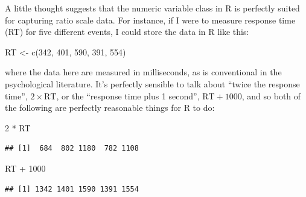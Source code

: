 \documentclass[
]{book}
\newenvironment{Shaded}{\begin{snugshade}}{\end{snugshade}}
\newcommand{\DecValTok}[1]{\textcolor[rgb]{0.00,0.00,0.81}{#1}}
\newcommand{\FunctionTok}[1]{\textcolor[rgb]{0.00,0.00,0.00}{#1}}
\newcommand{\NormalTok}[1]{#1}
\newcommand{\OtherTok}[1]{\textcolor[rgb]{0.56,0.35,0.01}{#1}}
\newcommand{\SpecialCharTok}[1]{\textcolor[rgb]{0.00,0.00,0.00}{#1}}
\begin{document}
A little thought suggests that the numeric variable class in R is perfectly suited for capturing ratio scale data. For instance, if I were to measure response time (RT) for five different events, I could store the data in R like this:

\begin{Shaded}
\begin{Highlighting}[]
\NormalTok{RT }\OtherTok{\textless{}{-}} \FunctionTok{c}\NormalTok{(}\DecValTok{342}\NormalTok{, }\DecValTok{401}\NormalTok{, }\DecValTok{590}\NormalTok{, }\DecValTok{391}\NormalTok{, }\DecValTok{554}\NormalTok{)}
\end{Highlighting}
\end{Shaded}

where the data here are measured in milliseconds, as is conventional in the psychological literature. It's perfectly sensible to talk about ``twice the response time'', \(2 \times \mbox{RT}\), or the ``response time plus 1 second'', \(\mbox{RT} + 1000\), and so both of the following are perfectly reasonable things for R to do:

\begin{Shaded}
\begin{Highlighting}[]
\DecValTok{2} \SpecialCharTok{*}\NormalTok{ RT}
\end{Highlighting}
\end{Shaded}

\begin{verbatim}
## [1]  684  802 1180  782 1108
\end{verbatim}

\begin{Shaded}
\begin{Highlighting}[]
\NormalTok{RT }\SpecialCharTok{+} \DecValTok{1000}
\end{Highlighting}
\end{Shaded}

\begin{verbatim}
## [1] 1342 1401 1590 1391 1554
\end{verbatim}
\end{document}
